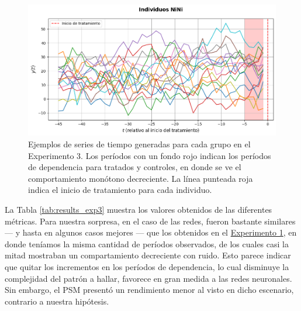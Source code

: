 \documentclass[../../main.tex]{subfiles}
\begin{document}
\begin{figure}[ht]
    \begin{minipage}{0.6\textwidth}
        \centering
        \includegraphics[scale=0.3]{figs/Exp3/ninis_sim63.png}
    \end{minipage}
    \caption{Ejemplos de series de tiempo generadas para cada grupo en el Experimento 3.
    Los períodos con un fondo rojo indican los períodos de dependencia para tratados y
    controles, en donde se ve el comportamiento monótono decreciente. La línea
    punteada roja indica el inicio de tratamiento para cada individuo.}
    \label{fig:time_series_exp3}
\end{figure}

La Tabla \ref{tab:results_exp3} muestra los valores obtenidos de las diferentes métricas.
Para nuestra sorpresa, en el caso de las redes, fueron bastante similares — y hasta en
algunos casos mejores — que los obtenidos en el \hyperref[sec:exp1]{Experimento 1}, en
donde teníamos la misma cantidad de períodos observados, de los cuales casi la mitad
mostraban un compartamiento decreciente con ruido. Esto parece indicar que quitar los
incrementos en los períodos de dependencia, lo cual disminuye la complejidad del patrón a
hallar, favorece en gran medida a las redes neuronales. Sin embargo, el PSM presentó un
rendimiento menor al visto en dicho escenario, contrario a nuestra hipótesis.
\end{document}
